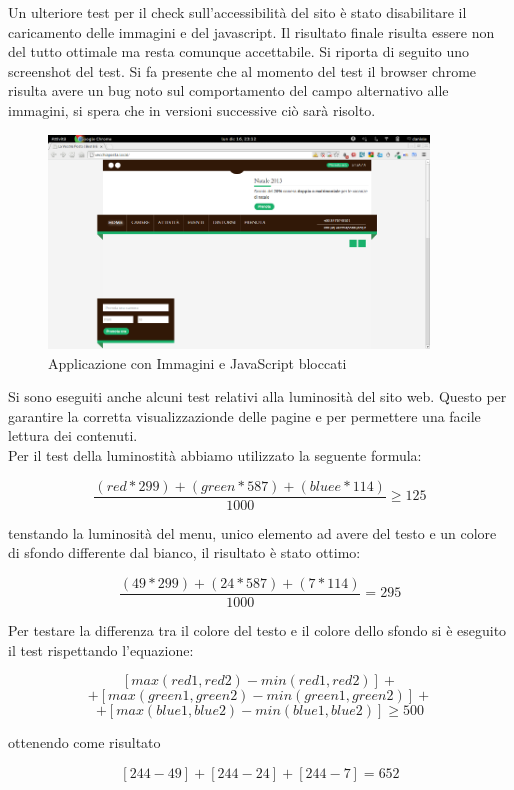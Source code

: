 \documentclass[a4paper,12pt,hidelinks]{report}
\begin{document}
\newpage
\par Un ulteriore test per il check sull'accessibilità del sito è stato disabilitare il caricamento delle immagini e del javascript. Il risultato finale risulta essere non del 
tutto ottimale ma resta comunque accettabile. Si riporta di seguito uno screenshot del test. Si fa presente che al momento del test il browser chrome risulta avere un bug 
noto sul comportamento del campo alternativo alle immagini, si spera che in versioni successive ciò sarà risolto.
\begin{figure}[h!]%
    \includegraphics[width=0.9\textwidth,keepaspectratio=true]{../img/noJsNoImg}
    \centering
    \caption{Applicazione con Immagini e JavaScript bloccati}%
    \label{fig:noJsNoImg}%
\end{figure}

\newpage
Si sono eseguiti anche alcuni test relativi alla luminosità del sito web. Questo per garantire la corretta visualizzazionde delle pagine e per permettere una facile lettura dei
contenuti.
\\Per il test della luminostità abbiamo utilizzato la seguente formula:

\[\frac{(red*299)+(green*587)+(bluee*114)}{1000} \geq {125}\]

tenstando la luminosità del menu, unico elemento ad avere del testo e un colore di sfondo differente dal bianco, il risultato è stato ottimo:

\[ \frac{(49*299)+(24*587)+(7*114)}{1000} = 295 \]

Per testare la differenza tra il colore del testo e il colore dello sfondo si è eseguito il test rispettando l'equazione:


\[[max(red1,red2)-min(red1,red2)]+ \]
\[+[max(green1,green2)-min(green1,green2)]+ \] 
\[+[max(blue1,blue2)-min(blue1,blue2)] \geq{500}\]

ottenendo come risultato

\[[244-49]+[244-24]+[244-7]={652}\]
\end{document}
